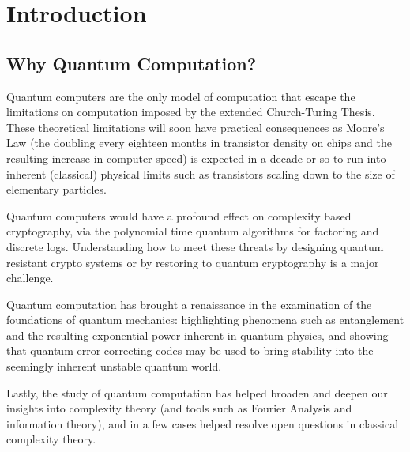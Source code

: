 \documentclass[12pt, oneside]{book}
\theoremstyle{definition}
\theoremstyle{definition}
\theoremstyle{remark}
\begin{document}

\mainmatter  %

\chapter{Introduction}
\section{Why Quantum Computation?}
Quantum computers are the only model of computation that escape the limitations on computation imposed by the extended Church-Turing Thesis. These theoretical limitations will soon have practical consequences as Moore's Law (the doubling every eighteen months in transistor density on chips and the resulting increase in computer speed) is expected in a decade or so to run into inherent (classical) physical limits such as transistors scaling down to the size of elementary particles. 

Quantum computers would have a profound effect on complexity based cryptography, via the polynomial time quantum algorithms for factoring and discrete logs. Understanding how to meet these threats by designing quantum resistant crypto systems or by restoring to quantum cryptography is a major challenge.

Quantum computation has brought a renaissance in the examination of the foundations of quantum mechanics: highlighting phenomena such as entanglement and the resulting exponential power inherent in quantum physics, and showing that quantum error-correcting codes may be used to bring stability into the seemingly inherent unstable quantum world.

Lastly, the study of quantum computation has helped broaden and deepen our insights into complexity theory (and tools such as Fourier Analysis and information theory), and in a few cases helped resolve open questions in classical complexity theory.
\end{document}
